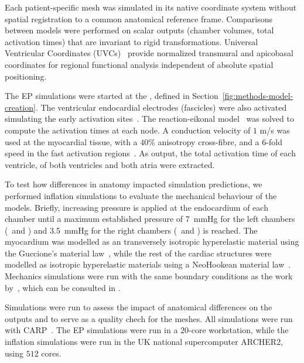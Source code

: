 Each patient-specific mesh was simulated in its native 
coordinate system without spatial registration to a common anatomical 
reference frame. Comparisons between models were performed on scalar 
outputs (chamber volumes, total activation times) that are invariant 
to rigid transformations. Universal Ventricular Coordinates 
(UVCs)~\cite{bayer2018} provide normalized transmural and apicobasal 
coordinates for regional functional analysis independent of absolute 
spatial positioning.

The EP simulations were started at the \SAN, defined in Section~\ref{fig:methods-model-creation}. 
The ventricular endocardial electrodes (fascicles) were also activated simulating the early activation 
sites~\cite{Gillette-2021-dt}. 
The reaction-eikonal model~\cite{neic-2017-electrograms} was solved to compute the activation 
times at each node. 
A conduction velocity of $1$ m/s was used at the myocardial tissue, with a 
$40\%$ anisotropy cross-fibre, and a 
$6$-fold speed in the fast activation regions~\cite{lee-2019-fec}. 
As output, the total activation time of each ventricle, of both ventricles and both atria were extracted.

To test how differences in anatomy impacted simulation predictions,
we performed inflation simulations to evaluate the mechanical behaviour of the models.
Briefly, increasing pressure is applied at the endocardium of each chamber until a 
maximum established pressure of  
7~mmHg for the left chambers (\LV\ and \LA) and
3.5~mmHg for the right chambers (\RV\ and \RA) 
is reached.
The myocardium was modelled as an transversely isotropic hyperelastic material using the 
Guccione's material law~\cite{Guccione-1991-material-props}, 
while the rest of the cardiac structures were modelled as isotropic hyperelastic materials using a 
NeoHookean material law~\cite{faulkner-1972-nearly}. 
Mechanics simulations were run with the same boundary conditions as the work by~\cite{strocchi2023_cell}, 
which can be consulted in .

Simulations were run to assess the impact of anatomical differences on the outputs and to serve as 
a quality chech for the meshes. 
All simulations were run with CARP~\cite{carp-2003}. 
The EP simulations were run in a $20$-core workstation, 
while the inflation simulations were run in the UK national supercomputer ARCHER2, using $512$ cores.

